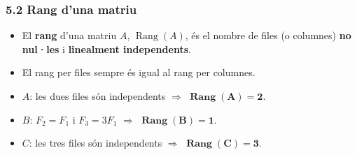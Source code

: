 \documentclass[aspectratio=169]{beamer}
\newcommand{\solucio}[1]{{\color{margueVerdFosc}\ensuremath{\mathbf{#1}}}}
\begin{document}
\begin{frame}[t]
  \frametitle{5.2 Rang d'una matriu}

  \vspace{-0.32cm}
  \begin{itemize}
    \item<1-> El \textbf{rang} d'una matriu $A$, $\operatorname{Rang}(A)$, és el nombre de files (o columnes) \textbf{no nul·les} i \textbf{linealment independents}.
    \item<2-> El rang per files sempre és igual al rang per columnes.
  \end{itemize}

  \vspace{0.08cm}
  \begin{itemize}
    \item<5-> $A$: les dues files són independents $\Rightarrow$ \solucio{\operatorname{Rang}(A) = 2}.
    \item<6-> $B$: $F_2 = F_1$ i $F_3 = 3F_1$ $\Rightarrow$ \solucio{\operatorname{Rang}(B) = 1}.
    \item<7-> $C$: les tres files són independents $\Rightarrow$ \solucio{\operatorname{Rang}(C) = 3}.
  \end{itemize}
\end{frame}
\end{document}

